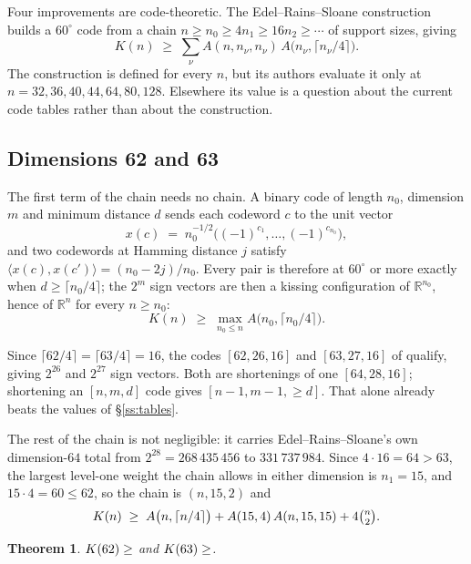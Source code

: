 \documentclass[11pt]{amsart}
\newtheorem{theorem}{Theorem}[section]
\theoremstyle{remark}
\newcommand{\ip}[2]{\langle #1,#2\rangle}
\newcommand{\R}{\mathbb{R}}
\begin{document}
Four improvements are code-theoretic. The Edel--Rains--Sloane construction
\cite{edel-rains-sloane1998} builds a $60^\circ$ code from a
chain $n\ge n_0\ge4n_1\ge16n_2\ge\cdots$ of support sizes, giving
\[
  K(n)\;\ge\;\sum_\nu A(n,n_\nu,n_\nu)\,A\bigl(n_\nu,\lceil n_\nu/4\rceil\bigr).
\]
The construction is defined for every $n$, but its authors evaluate it only at
$n=32,36,40,44,64,80,128$. Elsewhere its value is a question about the current
code tables rather than about the construction.

\subsection{Dimensions 62 and 63}\label{ss:d6263}

The first term of the chain needs no chain. A binary code of length $n_0$, dimension
$m$ and minimum distance $d$ sends each codeword $c$ to the unit vector
\[
  x(c)\;=\; n_0^{-1/2}\bigl((-1)^{c_1},\dots,(-1)^{c_{n_0}}\bigr),
\]
and two codewords at Hamming distance $j$ satisfy
$\ip{x(c)}{x(c')}=(n_0-2j)/n_0$. Every pair is therefore at $60^\circ$ or more
exactly when $d\ge\lceil n_0/4\rceil$; the $2^m$ sign vectors are then a
kissing configuration of $\R^{n_0}$, hence of $\R^n$ for every $n\ge n_0$:
\[
  K(n)\;\ge\; \max_{n_0\le n} A\bigl(n_0,\lceil n_0/4\rceil\bigr).
\]

Since $\lceil 62/4\rceil=\lceil 63/4\rceil=16$, the codes $[62,26,16]$ and
$[63,27,16]$ of \cite{codetables} qualify, giving $2^{26}$ and $2^{27}$ sign
vectors. Both are shortenings of one $[64,28,16]$; shortening an $[n,m,d]$ code
gives $[n-1,m-1,\ge d]$. That alone already beats the values of \S\ref{ss:tables}.

The rest of the chain is not negligible: it carries Edel--Rains--Sloane's own
dimension-$64$ total from $2^{28}=268\,435\,456$ to $331\,737\,984$. Since
$4\cdot16=64>63$, the largest level-one weight the chain allows in either dimension
is $n_1=15$, and $15\cdot4=60\le62$, so the chain is $(n,15,2)$ and
\[
  K(n)\;\ge\;A\bigl(n,\lceil n/4\rceil\bigr)+A(15,4)\,A(n,15,15)+4\tbinom{n}{2}.
\]

\begin{theorem}\label{thm:6263}
$K(62)\ge\Kh{62}$ and $K(63)\ge\Kh{63}$.
\end{theorem}
\end{document}
